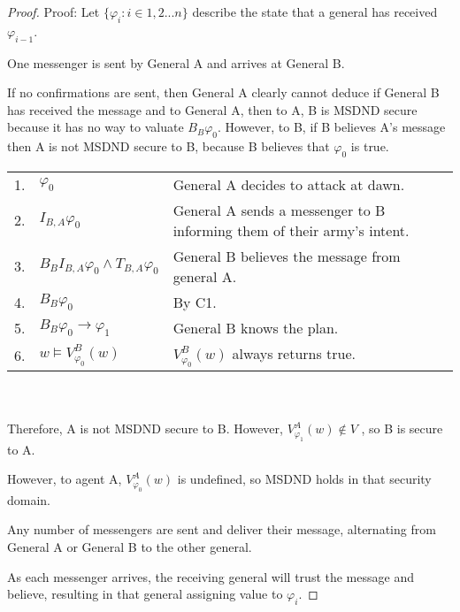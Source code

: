 \begin{proof}
Proof:
Let $\{ \varphi_i : i \in 1,2 ... n \}$ describe the state that a general has received $\varphi_{i-1}$.

\begin{case}
One messenger is sent by General A and arrives at General B.
\label{case:generalsn0}
\end{case}

If no confirmations are sent, then General A clearly cannot deduce if General B has received the message and to General A, then to A, B is MSDND secure because it has no way to valuate $B_B \varphi_0$. However, to B, if B believes A's message then A is not MSDND secure to B, because B believes that $\varphi_0$ is true.

\begin{table}[h!]
\centering
\small
\begin{tabularx}{\linewidth}{l l X}
1. & $\varphi_0$ & General A decides to attack at dawn. \\
2. & $I_{B,A} \varphi_0$ & General A sends a messenger to B informing them of their army's intent. \\
3. & $B_{B}I_{B,A} \varphi_0 \wedge T_{B,A} \varphi_0$ & General B believes the message from general A. \\
4. & $B_{B} \varphi_0$ & By C1. \\
5. & $B_{B} \varphi_0 \rightarrow \varphi_1$ & General B knows the plan. \\
6. & $w \vDash V_{\varphi_0}^{B}(w)$ & $V_{\varphi_0}^{B}(w)$ always returns true. \\
\end{tabularx} \\~\\
Therefore, A is not MSDND secure to B. However, $V_{\varphi_1}^{A}(w) \not \in V$ , so B is secure to A.
\label{tab:twoarmiesproof}
\end{table}

However, to agent A, $V_{\varphi_{0}}^A(w)$ is undefined, so MSDND holds in that security domain. 

\begin{case}
Any number of messengers are sent and deliver their message, alternating from General A or General B to the other general. \label{case:generalsnn}
\end{case}

As each messenger arrives, the receiving general will trust the message and believe, resulting in that general assigning value to $\varphi_i$.


\end{proof}
